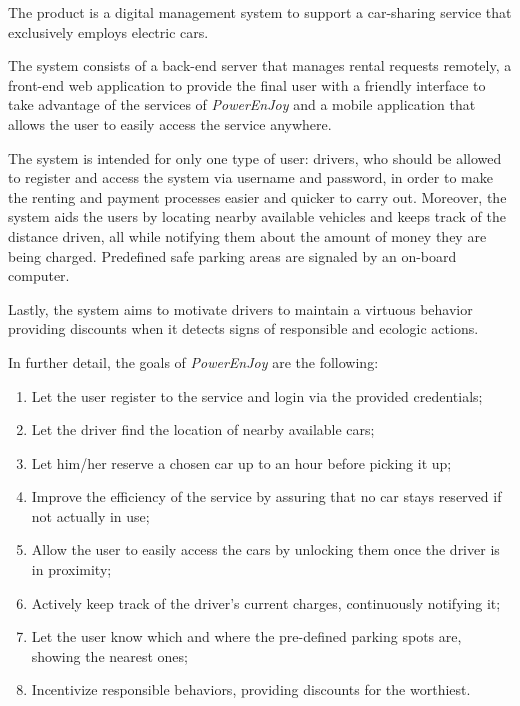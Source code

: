 The product is a digital management system to support a car-sharing service that exclusively employs electric cars.

The system consists of a back-end server that manages rental requests remotely, a front-end web application to provide the final user with a friendly interface to take advantage of the services of \hbox{\emph{PowerEnJoy}} and a mobile application that allows the user to easily access the service anywhere.

The system is intended for only one type of user: drivers, who should be allowed to register and access the system via username and password, in order to make the renting and payment processes easier and quicker to carry out. Moreover, the system aids the users by locating nearby available vehicles and keeps track of the distance driven, all while notifying them about the amount of money they are being charged. Predefined safe parking areas are signaled by an on-board computer.

Lastly, the system aims to motivate drivers to maintain a virtuous behavior providing discounts when it detects signs of responsible and ecologic actions.

In further detail, the goals of \hbox{\emph{PowerEnJoy}} are the following:

\begin{enumerate}
\item Let the user register to the service and login via the provided credentials;
\item Let the driver find the location of nearby available cars;
\item Let him/her reserve a chosen car up to an hour before picking it up;
\item Improve the efficiency of the service by assuring that no car stays reserved if not actually in use;
\item Allow the user to easily access the cars by unlocking them once the driver is in proximity;
\item Actively keep track of the driver's current charges, continuously notifying it;
\item Let the user know which and where the pre-defined parking spots are, showing the nearest ones;
\item Incentivize responsible behaviors, providing discounts for the worthiest.
\end{enumerate}